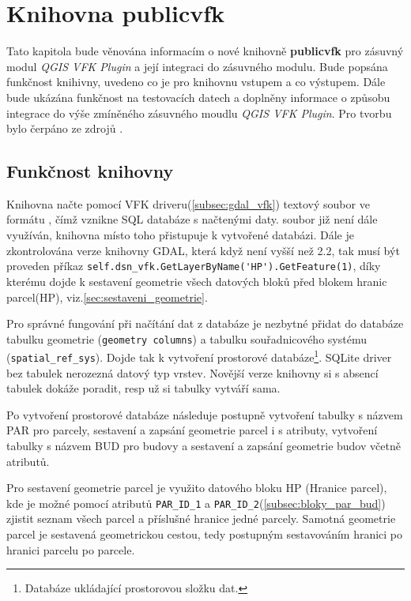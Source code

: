 \chapter{Knihovna publicvfk}
\label{4-plugin}
Tato kapitola bude věnována informacím o nové knihovně \textbf{publicvfk} pro zásuvný modul \textit{QGIS VFK Plugin} a její integraci do zásuvného modulu. Bude popsána funkčnost knihivny, uvedeno co je pro knihovnu vstupem a co výstupem. Dále bude ukázána funkčnost na testovacích datech a doplněny informace o způsobu integrace do výše zmíněného zásuvného moudlu \textit{QGIS VFK Plugin}. Pro tvorbu bylo čerpáno ze zdrojů \cite{cookbook, ucebnicepython}.

\section{Funkčnost knihovny}
\label{sec:funknost_knihovny}
Knihovna načte pomocí VFK driveru(\ref{subsec:gdal_vfk}) textový soubor ve formátu , čímž vznikne SQL databáze s načtenými daty.  soubor již není dále využíván, knihovna místo toho přistupuje k vytvořené databázi. Dále je zkontrolována verze knihovny GDAL, která když není vyšší než 2.2, tak musí být proveden příkaz \verb|self.dsn_vfk.GetLayerByName('HP').GetFeature(1)|, díky kterému dojde k sestavení geometrie všech datových bloků před blokem hranic parcel(HP), viz.\ref{sec:sestaveni_geometrie}.

Pro správné fungování při načítání dat z databáze je nezbytné přidat do databáze tabulku geometrie (\verb|geometry columns|) a tabulku souřadnicového systému (\verb|spatial_ref_sys|). Dojde tak k vytvoření prostorové databáze\footnote{Databáze ukládající prostorovou složku dat.}. SQLite driver bez tabulek nerozezná datový typ vrstev. Novější verze knihovny si s absencí tabulek dokáže poradit, resp už si tabulky vytváří sama.

Po vytvoření prostorové databáze následuje postupně vytvoření tabulky s názvem PAR pro parcely, sestavení a zapsání geometrie parcel i s atributy, vytvoření tabulky s názvem BUD pro budovy a sestavení a zapsání geometrie budov včetně atributů.

Pro sestavení geometrie parcel je využito datového bloku HP (Hranice parcel), kde je možné pomocí atributů \verb|PAR_ID_1| a \verb|PAR_ID_2|(\ref{subsec:bloky_par_bud}) zjistit seznam všech parcel a příslušné hranice jedné parcely. Samotná geometrie parcel je sestavená geometrickou cestou, tedy postupným sestavováním hranici po hranici parcelu po parcele.

